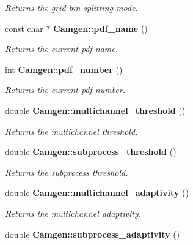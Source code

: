 \begin{DoxyCompactItemize}
\begin{DoxyCompactList}\small\item\em Returns the grid bin-\/splitting mode. \end{DoxyCompactList}\item 
\hypertarget{a00878_ade651df5baf7c473757ff2c69b2d32f5}{}const char $\ast$ {\bfseries Camgen\+::pdf\+\_\+name} ()\label{a00878_ade651df5baf7c473757ff2c69b2d32f5}

\begin{DoxyCompactList}\small\item\em Returns the current pdf name. \end{DoxyCompactList}\item 
\hypertarget{a00878_ab52216341809366c89f47bbc14d608de}{}int {\bfseries Camgen\+::pdf\+\_\+number} ()\label{a00878_ab52216341809366c89f47bbc14d608de}

\begin{DoxyCompactList}\small\item\em Returns the current pdf number. \end{DoxyCompactList}\item 
\hypertarget{a00878_adbd6755bcf0ce4875b7e2724dd95a4d6}{}double {\bfseries Camgen\+::multichannel\+\_\+threshold} ()\label{a00878_adbd6755bcf0ce4875b7e2724dd95a4d6}

\begin{DoxyCompactList}\small\item\em Returns the multichannel threshold. \end{DoxyCompactList}\item 
\hypertarget{a00878_a64845d4544eab34ef9f57ca5489e7d59}{}double {\bfseries Camgen\+::subprocess\+\_\+threshold} ()\label{a00878_a64845d4544eab34ef9f57ca5489e7d59}

\begin{DoxyCompactList}\small\item\em Returns the subprocess threshold. \end{DoxyCompactList}\item 
\hypertarget{a00878_a26b06cbad2fe3a549cf0102ef2605280}{}double {\bfseries Camgen\+::multichannel\+\_\+adaptivity} ()\label{a00878_a26b06cbad2fe3a549cf0102ef2605280}

\begin{DoxyCompactList}\small\item\em Returns the multichannel adaptivity. \end{DoxyCompactList}\item 
\hypertarget{a00878_a736671e9ed27610eab1526c638156c77}{}double {\bfseries Camgen\+::subprocess\+\_\+adaptivity} ()\label{a00878_a736671e9ed27610eab1526c638156c77}


\end{DoxyCompactItemize}
